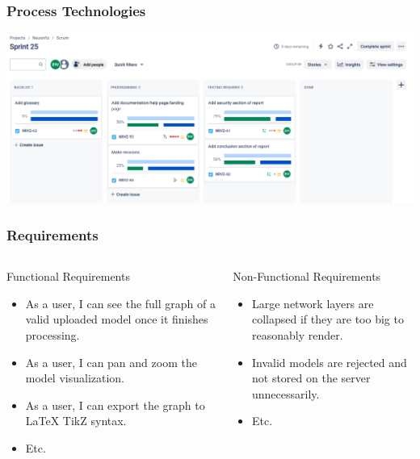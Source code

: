 \documentclass{beamer}
\begin{document}
\begin{frame}
    \frametitle{Process Technologies} 
    \centering
    \includegraphics[scale=0.22]{../02_dev_process/res/jira_board_sprint_25.png}
\end{frame}

\begin{frame}
    \frametitle{Requirements} 
    \begin{columns}
        \begin{column}{0.5\textwidth}
            \begin{block}{Functional Requirements}
                \begin{itemize}
                    \item As a user, I can see the full graph of a valid uploaded model once it finishes processing.
                    \item As a user, I can pan and zoom the model visualization.
                    \item As a user, I can export the graph to \LaTeX{} TikZ syntax.
                    \item Etc.
                \end{itemize}
            \end{block}
        \end{column}
        \pause
        \begin{column}{0.5\textwidth}
            \begin{block}{Non-Functional Requirements}
                \begin{itemize}
                    \item Large network layers are collapsed if they are too big to reasonably render.
                    \item Invalid models are rejected and not stored on the server unnecessarily.
                    \item Etc.
                \end{itemize}
            \end{block}
        \end{column}
    \end{columns}
\end{frame}
\end{document}
